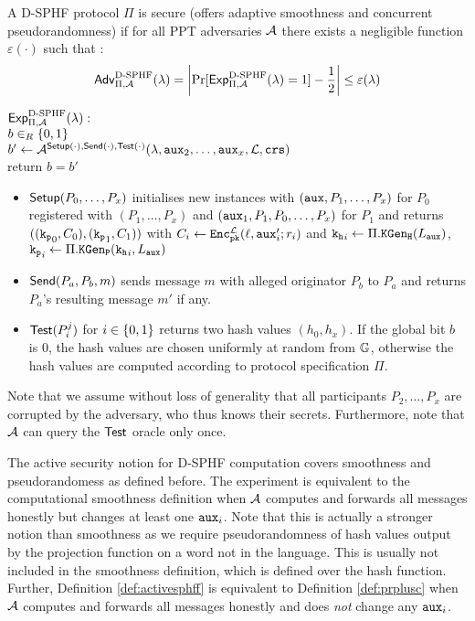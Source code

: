\begin{definition}\label{def:activesphff}
A \ac{D-SPHF} protocol $\Pi$ is secure (offers adaptive smoothness and concurrent pseudorandomness) if for all \ac{PPT} adversaries $\mathcal{A}$ there exists a negligible function $\varepsilon(\cdot)$ such that :
\[\mathsf{Adv}_{\Pi,\mathcal{A}}^{\text{D-SPHF}}(\lambda)=\left|\Pr[\mathsf{Exp}^{\text{D-SPHF}}_{\Pi,\mathcal{A}}(\lambda)=1]-\frac12\right|\leq\varepsilon(\lambda)\]

\noindent
$\mathsf{Exp}^{\text{D-SPHF}}_{\Pi,\mathcal{A}}(\lambda):$ \\
\hspace*{2em} $b\in_R\{0,1\}$ \\
\hspace*{2em} $b'\gets\mathcal{A}^{\mathsf{Setup}(\cdot),\mathsf{Send}(\cdot),\mathsf{Test}(\cdot)}(\lambda,\mathtt{aux}_2,\dots,\allowbreak \mathtt{aux}_x,\mathcal{L},\mathtt{crs})$ \\
\hspace*{2em} return $b=b'$

\begin{itemize}
	\item $\mathsf{Setup}(P_0,\dots,P_x)$ initialises new instances with $(\mathtt{aux},P_1,\dots,P_x)$ for $P_0$ registered with $(P_1,\dots,P_x)$ and $(\mathtt{aux}_1,P_1,P_0,\dots,P_x)$ for $P_1$ and returns $((\mathtt{k_p}_0,\allowbreak C_0),(\mathtt{k_p}_1,C_1))$ with $C_i\gets\mathtt{Enc}_{\mathtt{pk}}^{\mathcal{L}}(\ell,\mathtt{aux}'_i;r_i)$ and $\mathtt{k_h}_i\gets\Pi.\mathtt{KGen_H}(L_\mathtt{aux})$, $\mathtt{k_p}_i\gets\Pi.\mathtt{KGen_P}(\mathtt{k_h}_i,L_\mathtt{aux})$
		
	\item $\mathsf{Send}(P_a,P_b,m)$ sends message $m$ with alleged originator $P_b$ to $P_a$ and returns $P_a$'s resulting message $m'$ if any.
	
	\item $\mathsf{Test}(P_i^j)$ for $i\in\{0,1\}$ returns two hash values $(h_0,h_x)$. If the global bit $b$ is $0$, the hash values are chosen uniformly at random from $\mathbb{G}$, otherwise the hash values are computed according to protocol specification $\Pi$. \eod
\end{itemize}
\end{definition}

\noindent
Note that we assume without loss of generality that all participants $P_2,\dots,P_x$ are corrupted by the adversary, who thus knows their secrets.
Furthermore, note that $\mathcal{A}$ can query the $\mathsf{Test}$ oracle only once.

The active security notion for \ac{D-SPHF} computation covers smoothness and pseudorandomess as defined before.
The experiment is equivalent to the computational smoothness definition when $\mathcal{A}$ computes and forwards all messages honestly but changes at least one $\mathtt{aux}_i$.
Note that this is actually a stronger notion than smoothness as we require pseudorandomness of hash values output by the projection function on a word not in the language.
This is usually not included in the smoothness definition, which is defined over the hash function.
Further, Definition \ref{def:activesphff} is equivalent to Definition \ref{def:prplusc} when $\mathcal{A}$ computes and forwards all messages honestly and does \emph{not} change any $\mathtt{aux}_i$.

